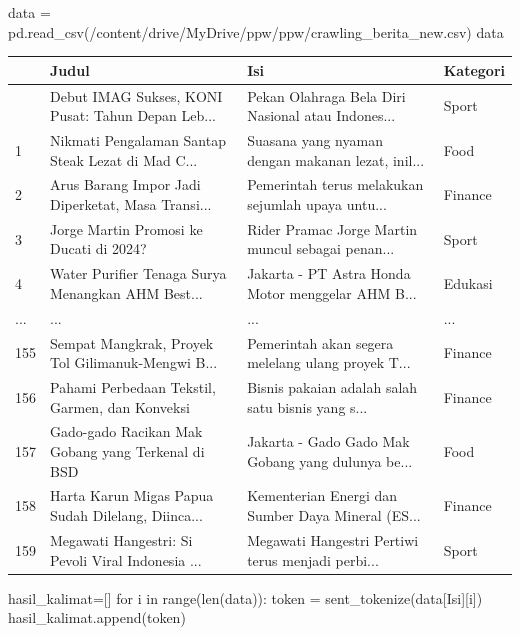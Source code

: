 \documentclass[
  letterpaper,
]{krantz}
\makeatletter
\newenvironment{Shaded}{\begin{snugshade}}{\end{snugshade}}
\newcommand{\BuiltInTok}[1]{\textcolor[rgb]{0.00,0.23,0.31}{#1}}
\newcommand{\ControlFlowTok}[1]{\textcolor[rgb]{0.00,0.23,0.31}{#1}}
\newcommand{\KeywordTok}[1]{\textcolor[rgb]{0.00,0.23,0.31}{#1}}
\newcommand{\NormalTok}[1]{\textcolor[rgb]{0.00,0.23,0.31}{#1}}
\newcommand{\OperatorTok}[1]{\textcolor[rgb]{0.37,0.37,0.37}{#1}}
\newcommand{\StringTok}[1]{\textcolor[rgb]{0.13,0.47,0.30}{#1}}
\newenvironment{kframe}{%
\medskip{}
\setlength{\fboxsep}{.8em}
 \def\at@end@of@kframe{}%
 \ifinner\ifhmode%
  \def\at@end@of@kframe{\end{minipage}}%
  \begin{minipage}{\columnwidth}%
 \fi\fi%
 \def\FrameCommand##1{\hskip\@totalleftmargin \hskip-\fboxsep
 \colorbox{shadecolor}{##1}\hskip-\fboxsep
     \hskip-\linewidth \hskip-\@totalleftmargin \hskip\columnwidth}%
 \MakeFramed {\advance\hsize-\width
   \@totalleftmargin\z@ \linewidth\hsize
   \@setminipage}}%
 {\par\unskip\endMakeFramed%
 \at@end@of@kframe}
\renewenvironment{Shaded}{\begin{kframe}}{\end{kframe}}
\makeatother
\begin{document}
\begin{Shaded}
\begin{Highlighting}[]
\NormalTok{data }\OperatorTok{=}\NormalTok{ pd.read\_csv(}\StringTok{\textquotesingle{}/content/drive/MyDrive/ppw/ppw/crawling\_berita\_new.csv\textquotesingle{}}\NormalTok{)}
\NormalTok{data}
\end{Highlighting}
\end{Shaded}

\begin{longtable}[]{@{}llll@{}}
\toprule\noalign{}
& Judul & Isi & Kategori \\
\midrule\noalign{}
\endhead
\bottomrule\noalign{}
\endlastfoot
0 & Debut IMAG Sukses, KONI Pusat: Tahun Depan Leb... & Pekan Olahraga
Bela Diri Nasional atau Indones... & Sport \\
1 & Nikmati Pengalaman Santap Steak Lezat di Mad C... & Suasana yang
nyaman dengan makanan lezat, inil... & Food \\
2 & Arus Barang Impor Jadi Diperketat, Masa Transi... & Pemerintah terus
melakukan sejumlah upaya untu... & Finance \\
3 & Jorge Martin Promosi ke Ducati di 2024? & Rider Pramac Jorge Martin
muncul sebagai penan... & Sport \\
4 & Water Purifier Tenaga Surya Menangkan AHM Best... & Jakarta - PT
Astra Honda Motor menggelar AHM B... & Edukasi \\
... & ... & ... & ... \\
155 & Sempat Mangkrak, Proyek Tol Gilimanuk-Mengwi B... & Pemerintah
akan segera melelang ulang proyek T... & Finance \\
156 & Pahami Perbedaan Tekstil, Garmen, dan Konveksi & Bisnis pakaian
adalah salah satu bisnis yang s... & Finance \\
157 & Gado-gado Racikan Mak Gobang yang Terkenal di BSD & Jakarta - Gado
Gado Mak Gobang yang dulunya be... & Food \\
158 & Harta Karun Migas Papua Sudah Dilelang, Diinca... & Kementerian
Energi dan Sumber Daya Mineral (ES... & Finance \\
159 & Megawati Hangestri: Si Pevoli Viral Indonesia ... & Megawati
Hangestri Pertiwi terus menjadi perbi... & Sport \\
\end{longtable}

\begin{Shaded}
\begin{Highlighting}[]
\NormalTok{hasil\_kalimat}\OperatorTok{=}\NormalTok{[]}
\ControlFlowTok{for}\NormalTok{ i }\KeywordTok{in} \BuiltInTok{range}\NormalTok{(}\BuiltInTok{len}\NormalTok{(data)):}
\NormalTok{  token }\OperatorTok{=}\NormalTok{ sent\_tokenize(data[}\StringTok{\textquotesingle{}Isi\textquotesingle{}}\NormalTok{][i])}
\NormalTok{  hasil\_kalimat.append(token)}
\end{Highlighting}
\end{Shaded}
\end{document}
